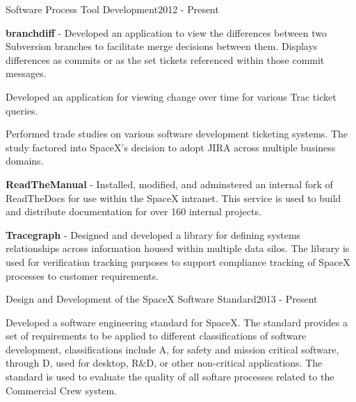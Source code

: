 \begin{cventries}

  \cventry
  {Software Process Tool Development}{}{}{2012 - Present}
  {
    \begin{cvitems}
    \item \textbf{branchdiff} - Developed an application to view the differences
      between two Subversion branches to facilitate merge decisions
      between them. Displays differences as commits or as the set tickets
      referenced within those commit messages.
    \item Developed an application for viewing change over time for various Trac
      ticket queries.
    \item Performed trade studies on various software development
      ticketing systems. The study factored into SpaceX's decision to
      adopt JIRA across multiple business domains.
    \item \textbf{ReadTheManual} - Installed, modified, and adminstered an
      internal fork of ReadTheDocs for use within the SpaceX
      intranet. This service is used to build and distribute documentation
      for over 160 internal projects.
    \item \textbf{Tracegraph} - Designed and developed a library for
      defining systems relationships across information housed within
      multiple data silos. The library is used for verification tracking
      purposes to support compliance tracking of SpaceX processes to
      customer requirements.
    \end{cvitems}
  }


  \cventry
  {Design and Development of the SpaceX Software Standard}{}{}{2013 - Present}
  {
    \begin{cvitems}
    \item Developed a software engineering standard for SpaceX. The
      standard provides a set of requirements to be applied to different
      classifications of software development, classifications include A,
      for safety and mission critical software, through D, used for
      desktop, R\&D, or other non-critical applications. The standard is
      used to evaluate the quality of all softare processes related to the
      Commercial Crew system.
    \end{cvitems}
  }



\end{cventries}
